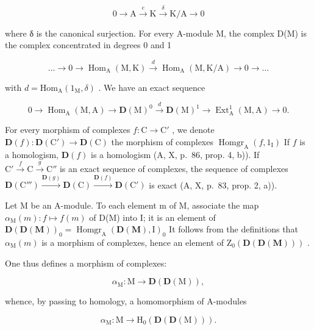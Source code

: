 \[
0 \to \mathrm{A} \stackrel {e} {\longrightarrow} \mathrm{K} \stackrel {\delta} {\longrightarrow} \mathrm{K/A} \to 0
\]

where δ is the canonical surjection. For every A-module M, the complex D(M) is the complex concentrated in degrees 0 and 1

\[
\dots \longrightarrow 0 \longrightarrow \operatorname{Hom} _ {\mathrm{A}} (\mathrm{M}, \mathrm{K}) \stackrel {d} {\longrightarrow} \operatorname{Hom} _ {\mathrm{A}} (\mathrm{M}, \mathrm{K} / \mathrm{A}) \longrightarrow 0 \longrightarrow \dots
\]

with \(d = \mathrm{Hom}_{\mathrm{A}}(1_{\mathrm{M}},\delta)\) . We have an exact sequence

\[
0 \to \operatorname{Hom} _ {\mathrm{A}} (\mathrm{M}, \mathrm{A}) \longrightarrow \mathbf {D} (\mathrm{M}) ^ {0} \stackrel {d} {\longrightarrow} \mathbf {D} (\mathrm{M}) ^ {1} \longrightarrow \operatorname{Ext} _ {\mathrm{A}} ^ {1} (\mathrm{M}, \mathrm{A}) \to 0.
\]

For every morphism of complexes \(f: \mathrm{C} \to \mathrm{C}'\) , we denote \(\mathbf{D}(f): \mathbf{D}(\mathrm{C}') \to \mathbf{D}(\mathrm{C})\) the morphism of complexes \(\operatorname{Homgr}_{\mathrm{A}}(f, 1_{\mathrm{I}})\) If \(f\) is a homologism, \(\mathbf{D}(f)\) is a homologism (A, X, p.~86, prop. 4, b)). If \(\mathrm{C}' \xrightarrow{f} \mathrm{C} \xrightarrow{g} \mathrm{C}''\) is an exact sequence of complexes, the sequence of complexes \(\mathbf{D}(\mathrm{C}''') \xrightarrow{\mathbf{D}(g)} \mathbf{D}(\mathrm{C}) \xrightarrow{\mathbf{D}(f)} \mathbf{D}(\mathrm{C}')\) is exact (A, X, p.~83, prop. 2, a)).

Let M be an A-module. To each element m of M, associate the map \(\alpha_{\mathrm{M}}(m): f \mapsto f(m)\) of D(M) into I; it is an element of \(\mathbf{D}(\mathbf{D}(\mathbf{M}))_{0} = \operatorname{Homgr}_{\mathrm{A}}(\mathbf{D}(\mathbf{M}), \mathrm{I})_{0}\) It follows from the definitions that \(\alpha_{\mathrm{M}}(m)\) is a morphism of complexes, hence an element of \(\mathrm{Z}_{0}(\mathbf{D}(\mathbf{D}(\mathbf{M})))\) .

One thus defines a morphism of complexes:

\[
\alpha_ {\mathrm{M}}: \mathrm{M} \rightarrow \mathbf {D} (\mathbf {D} (\mathrm{M})) ,
\]

whence, by passing to homology, a homomorphism of A-modules

\[
\alpha_ {\mathrm{M}}: \mathrm{M} \to \mathrm{H} _ {0} (\mathbf {D} (\mathbf {D} (\mathrm{M}))).
\]

